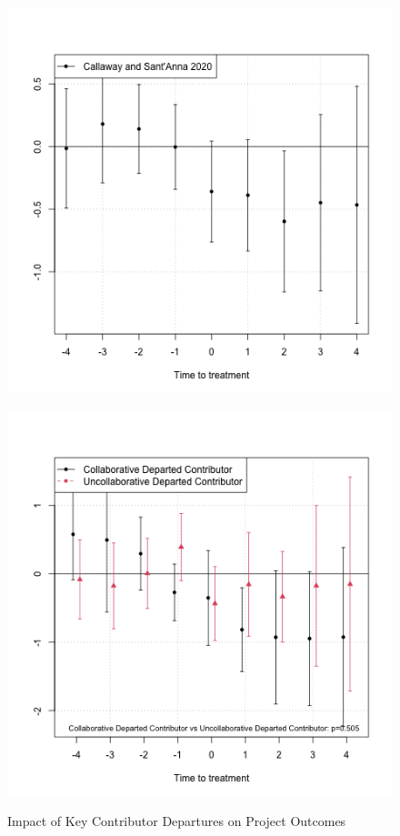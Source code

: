 \begin{figure}[htbp]
    \centering
    \begin{minipage}[b]{0.49\textwidth}
        \centering
        \includegraphics[width=\textwidth]{temp/output/prs_opened_norm.png}
        \label{fig:all_prs_opened}
    \end{minipage}
    \hfill
    \begin{minipage}[b]{0.49\textwidth}
        \centering
        \includegraphics[width=\textwidth]{temp/output/collab/prs_opened_collab_cs_norm.png}
        \label{fig:all_prs_opened_collab}
    \end{minipage}
    \caption{Impact of Key Contributor Departures on Project Outcomes}
    \label{fig:prs_opened}
\end{figure}
